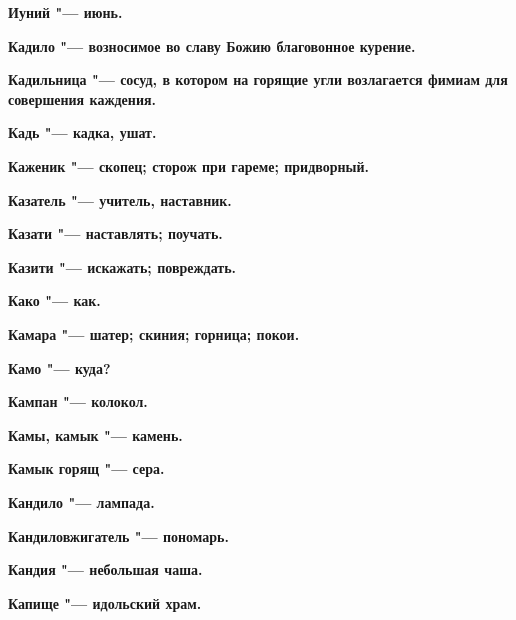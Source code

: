 \bfseries Иуний \normalfont{} "--- июнь. 




 





\bfseries Кадило \normalfont{} "--- возносимое во славу Божию благовонное курение. 




\bfseries Кадильница \normalfont{} "--- сосуд, в котором на горящие угли возлагается фимиам для совершения каждения. 




\bfseries Кадь \normalfont{} "--- кадка, ушат. 




\bfseries Каженик \normalfont{} "--- скопец; сторож при гареме; придворный. 




\bfseries Казатель \normalfont{} "--- учитель, наставник. 




\bfseries Казати \normalfont{} "--- наставлять; поучать. 




\bfseries Казити \normalfont{} "--- искажать; повреждать. 




\bfseries Како \normalfont{} "--- как. 




\bfseries Камара \normalfont{} "--- шатер; скиния; горница; покои. 




\bfseries Камо \normalfont{} "--- куда? 




\bfseries Кампан \normalfont{} "--- колокол. 




\bfseries Камы, камык \normalfont{} "--- камень. 




\bfseries Камык горящ \normalfont{} "--- сера. 




\bfseries Кандило \normalfont{} "--- лампада. 




\bfseries Кандиловжигатель \normalfont{} "--- пономарь. 




\bfseries Кандия \normalfont{} "--- небольшая чаша. 




\bfseries Капище \normalfont{} "--- идольский храм. 




